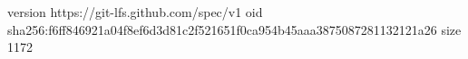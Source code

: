 version https://git-lfs.github.com/spec/v1
oid sha256:f6ff846921a04f8ef6d3d81c2f521651f0ca954b45aaa3875087281132121a26
size 1172
